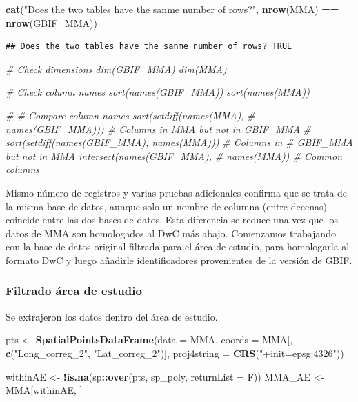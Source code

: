\documentclass[sn-apa,pdflatex]{sn-jnl}
\newenvironment{Shaded}{\begin{snugshade}}{\end{snugshade}}
\newcommand{\AttributeTok}[1]{\textcolor[rgb]{0.13,0.29,0.53}{#1}}
\newcommand{\CommentTok}[1]{\textcolor[rgb]{0.56,0.35,0.01}{\textit{#1}}}
\newcommand{\FunctionTok}[1]{\textcolor[rgb]{0.13,0.29,0.53}{\textbf{#1}}}
\newcommand{\NormalTok}[1]{#1}
\newcommand{\OtherTok}[1]{\textcolor[rgb]{0.56,0.35,0.01}{#1}}
\newcommand{\SpecialCharTok}[1]{\textcolor[rgb]{0.81,0.36,0.00}{\textbf{#1}}}
\newcommand{\StringTok}[1]{\textcolor[rgb]{0.31,0.60,0.02}{#1}}
\begin{document}
\begin{Shaded}
\begin{Highlighting}[]
\FunctionTok{cat}\NormalTok{(}\StringTok{"Does the two tables have the sanme number of rows?"}\NormalTok{, }\FunctionTok{nrow}\NormalTok{(MMA) }\SpecialCharTok{==}
    \FunctionTok{nrow}\NormalTok{(GBIF\_MMA))}
\end{Highlighting}
\end{Shaded}

\begin{verbatim}
## Does the two tables have the sanme number of rows? TRUE
\end{verbatim}

\begin{Shaded}
\begin{Highlighting}[]
\CommentTok{\# Check dimensions dim(GBIF\_MMA) dim(MMA)}

\CommentTok{\# Check column names sort(names(GBIF\_MMA)) sort(names(MMA))}

\CommentTok{\# \# Compare column names sort(setdiff(names(MMA),}
\CommentTok{\# names(GBIF\_MMA))) \# Columns in MMA but not in GBIF\_MMA}
\CommentTok{\# sort(setdiff(names(GBIF\_MMA), names(MMA))) \# Columns in}
\CommentTok{\# GBIF\_MMA but not in MMA intersect(names(GBIF\_MMA),}
\CommentTok{\# names(MMA)) \# Common columns}
\end{Highlighting}
\end{Shaded}

Mismo número de registros y varias pruebas adicionales confirma que se
trata de la misma base de datos, aunque solo un nombre de columna (entre
decenas) coincide entre las dos bases de datos. Esta diferencia se
reduce una vez que los datos de MMA son homologados al DwC más abajo.
Comenzamos trabajando con la base de datos original filtrada para el
área de estudio, para homologarla al formato DwC y luego añadirle
identificadores provenientes de la versión de GBIF.

\subsubsection{Filtrado área de
estudio}\label{filtrado-uxe1rea-de-estudio-3}

Se extrajeron los datos dentro del área de estudio.

\begin{Shaded}
\begin{Highlighting}[]
\NormalTok{pts }\OtherTok{\textless{}{-}} \FunctionTok{SpatialPointsDataFrame}\NormalTok{(}\AttributeTok{data =}\NormalTok{ MMA, }\AttributeTok{coords =}\NormalTok{ MMA[, }\FunctionTok{c}\NormalTok{(}\StringTok{"Long\_correg\_2"}\NormalTok{,}
    \StringTok{"Lat\_correg\_2"}\NormalTok{)], }\AttributeTok{proj4string =} \FunctionTok{CRS}\NormalTok{(}\StringTok{"+init=epsg:4326"}\NormalTok{))}

\NormalTok{withinAE }\OtherTok{\textless{}{-}} \SpecialCharTok{!}\FunctionTok{is.na}\NormalTok{(sp}\SpecialCharTok{::}\FunctionTok{over}\NormalTok{(pts, sp\_poly, }\AttributeTok{returnList =}\NormalTok{ F))}
\NormalTok{MMA\_AE }\OtherTok{\textless{}{-}}\NormalTok{ MMA[withinAE, ]}
\end{Highlighting}
\end{Shaded}
\end{document}
